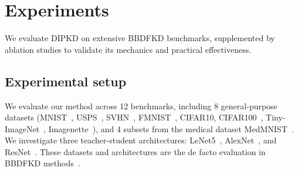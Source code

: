 \section{Experiments} \label{sec:44-research02-experiments}
\begin{foldable}
    We evaluate DIPKD on extensive BBDFKD benchmarks, supplemented by ablation studies to validate its mechanics and practical effectiveness.
\end{foldable}

\subsection{Experimental setup} \label{ch4:ssec:04-experiments-setup}
\begin{foldable}
    We evaluate our method across 12 benchmarks, including 8 general-purpose datasets (MNIST~\cite{lecun1998gradient}, USPS~\cite{hull1994database}, SVHN~\cite{netzer2011reading}, FMNIST~\cite{xiao2017fashion}, CIFAR10, CIFAR100~\cite{krizhevsky2009learning}, Tiny-ImageNet~\cite{le2015tiny}, Imagenette~\cite{howard2020imagenette}), and 4 subsets from the medical dataset MedMNIST~\cite{yang2021medmnist}.
    We investigate three teacher-student architectures: LeNet5~\cite{lecun1998gradient}, AlexNet~\cite{krizhevsky2012imagenet}, and ResNet~\cite{he2016deep}.
    These datasets and architectures are the de facto evaluation in BBDFKD methods~\cite{wang2021zero, zhang2022ideal, yuan2024data}.
\end{foldable}


